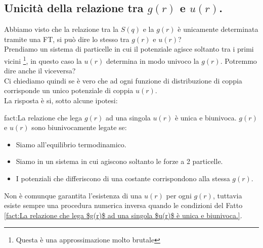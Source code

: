 \subsection{Unicità della relazione tra $g(r)$ e $u(r)$.}
\label{subsec:Unicità della relazione tra $g(r)$ e $u(r)$.}
Abbiamo visto che la relazione tra la $S(q)$ e la $g(r)$ è unicamente determinata tramite una FT, si può dire lo stesso tra $g(r)$ e $u(r)$?\\
Prendiamo un sistema di particelle in cui il potenziale agisce soltanto tra i primi vicini \footnote{Questa è una approssimazione molto brutale}, in questo caso la $u(r)$ determina in modo univoco la $g(r)$. Potremmo dire anche il viceversa?\\
Ci chiediamo quindi se è vero che ad ogni funzione di distribuzione di coppia corrisponde un unico potenziale di coppia $u(r)$.\\
La risposta è si, sotto alcune ipotesi:
\begin{fact}{fact:La relazione che lega $g(r)$ ad una singola $u(r)$ è unica e biunivoca.}
	$g(r)$ e $u(r)$ sono biunivocamente legate se:
	\begin{itemize}
		\item Siamo all'equilibrio termodinamico.
		\item Siamo in un sistema in cui agiscono soltanto le forze a 2 particelle.
		\item I potenziali che differiscono di una costante corrispondono alla
			stessa $g(r)$.
	\end{itemize}
\end{fact}
Non è comunque garantita l'esistenza di una $u(r)$ per ogni $g(r)$, tuttavia esiste sempre una procedura numerica inversa quando le condizioni del Fatto \ref{fact:La relazione che lega $g(r)$ ad una singola $u(r)$ è unica e biunivoca.}.\\ 
